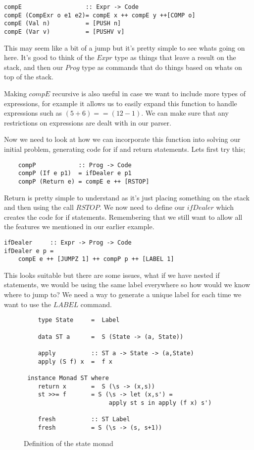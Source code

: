 \begin{lstlisting}
compE                  :: Expr -> Code
compE (CompExr o e1 e2)= compE x ++ compE y ++[COMP o]
compE (Val n)          = [PUSH n]
compE (Var v)          = [PUSHV v]
\end{lstlisting}  

This may seem like a bit of a jump but it's pretty simple to see whats going on here. It's good to think of the $Expr$ type as things that leave a result on the stack, and then our $Prog$ type as commands that do things based on whats on top of the stack.

Making $compE$ recursive is also useful in case we want to include more types of expressions, for example it allows us to easily expand this function to handle expressions such as $(5 + 6) == (12 - 1)$. We can make sure that any restrictions on expressions are dealt with in our parser. 

Now we need to look at how we can incorporate this function into solving our initial problem, generating code for if and return statements. Lets first try this; 

\begin{lstlisting}
	compP            :: Prog -> Code 
	compP (If e p1)  = ifDealer e p1  
	compP (Return e) = compE e ++ [RSTOP] 
\end{lstlisting}

Return is pretty simple to understand as it's just placing something on the stack and then using the call $RSTOP$. We now need to define our $ifDealer$ which creates the code for if statements. Remembering that we still want to allow all the features we mentioned in our earlier example.

\begin{lstlisting}
ifDealer     :: Expr -> Prog -> Code 
ifDealer e p = 
	compE e ++ [JUMPZ 1] ++ compP p ++ [LABEL 1]
\end{lstlisting}

This looks suitable but there are some issues, what if we have nested if statements, we would be using the same label everywhere so how would we know where to jump to? We need a way to generate a unique label for each time we want to use the $LABEL$ command.

\begin{figure}[h]
\centering
\begin{lstlisting}
    type State 	   =  Label

    data ST a 	   =  S (State -> (a, State))

    apply          :: ST a -> State -> (a,State)
    apply (S f) x  =  f x

 instance Monad ST where
    return x       =  S (\s -> (x,s))
    st >>= f   	   = S (\s -> let (x,s') = 
                        apply st s in apply (f x) s')

    fresh          :: ST Label
    fresh          = S (\s -> (s, s+1))

\end{lstlisting}
\caption{Definition of the state monad}
\label{fig:stMonad}
\end{figure}  

